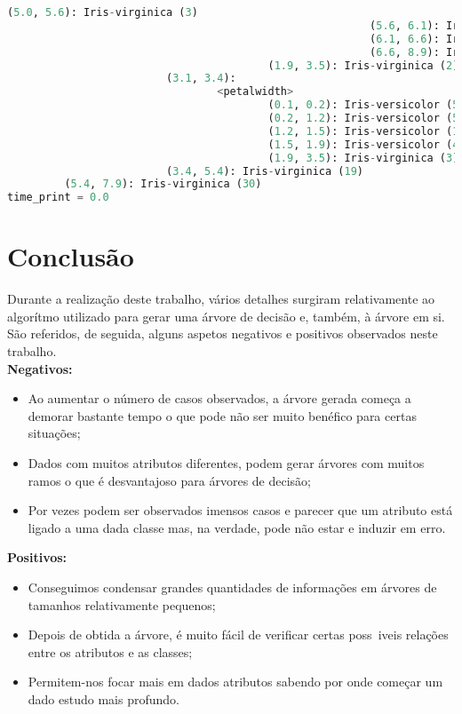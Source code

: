 \documentclass{article}
\begin{document}
\begin{lstlisting}[language = Python]
                                                         (5.0, 5.6): Iris-virginica (3)
                                                         (5.6, 6.1): Iris-virginica (2)
                                                         (6.1, 6.6): Iris-virginica (1)
                                                         (6.6, 8.9): Iris-versicolor (1)
                                         (1.9, 3.5): Iris-virginica (2)
                         (3.1, 3.4):
                                 <petalwidth>
                                         (0.1, 0.2): Iris-versicolor (5)
                                         (0.2, 1.2): Iris-versicolor (5)
                                         (1.2, 1.5): Iris-versicolor (1)
                                         (1.5, 1.9): Iris-versicolor (4)
                                         (1.9, 3.5): Iris-virginica (3)
                         (3.4, 5.4): Iris-virginica (19)
         (5.4, 7.9): Iris-virginica (30)
time_print = 0.0
\end{lstlisting}
\newpage
\section{Conclusão}
\hspace{10mm}Durante a realização deste trabalho, vários detalhes surgiram relativamente ao algorítmo utilizado para gerar uma árvore de decisão e, também, à árvore em si. São referidos, de seguida, alguns aspetos negativos e positivos observados neste trabalho.\\[5mm]
\textbf{Negativos:}
\begin{itemize}
\item{Ao aumentar o número de casos observados, a árvore gerada começa a demorar bastante tempo o que pode não ser muito benéfico para certas situações;}
\item{Dados com muitos atributos diferentes, podem gerar árvores com muitos ramos o que é desvantajoso para árvores de decisão;}
\item{Por vezes podem ser observados imensos casos e parecer que um atributo está ligado a uma dada classe mas, na verdade, pode não estar e induzir em erro.}
\end{itemize}
\textbf{Positivos:}
\begin{itemize}
\item{Conseguimos condensar grandes quantidades de informações em árvores de tamanhos relativamente pequenos;}
\item{Depois de obtida a árvore, é muito fácil de verificar certas poss~iveis relações entre os atributos e as classes;}
\item{Permitem-nos focar mais em dados atributos sabendo por onde começar um dado estudo mais profundo.}
\end{itemize}
\end{document}
